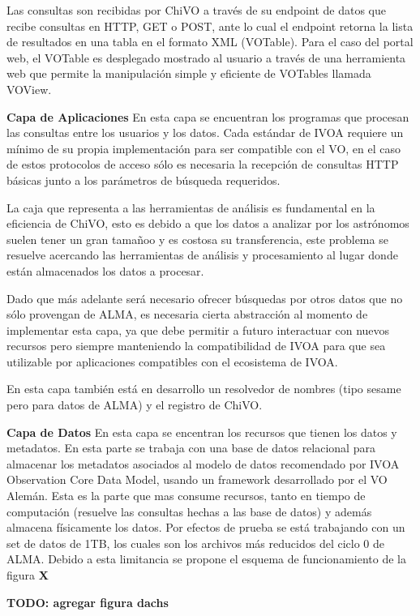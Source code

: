 Las consultas son recibidas por ChiVO a través de su endpoint de datos que recibe consultas en HTTP, GET o POST, ante lo cual el endpoint retorna la lista de resultados en una tabla en el formato XML (VOTable). Para el caso del portal web, el VOTable es desplegado mostrado al usuario a través de una herramienta web que permite la manipulación simple y eficiente de VOTables llamada VOView.

\textbf{Capa de Aplicaciones}
En esta capa se encuentran los programas que procesan las consultas entre los usuarios y los datos. 
Cada estándar de IVOA requiere un mínimo de su propia implementación para ser compatible con el VO, en el caso de estos protocolos de acceso sólo es necesaria la recepción de consultas HTTP básicas junto a los parámetros de búsqueda requeridos.

La caja que representa a las herramientas de análisis es fundamental en la eficiencia de ChiVO, esto es debido a que los datos a analizar por los astrónomos suelen tener un gran tamañoo y es costosa su transferencia, este problema se resuelve acercando las herramientas de análisis y procesamiento al lugar donde están almacenados los datos a procesar. 

Dado que más adelante será necesario ofrecer búsquedas por otros datos que no sólo provengan de ALMA, es necesaria cierta abstracción al momento de implementar esta capa, ya que debe permitir a futuro interactuar con nuevos recursos pero siempre manteniendo la compatibilidad de IVOA para que sea utilizable por aplicaciones compatibles con el ecosistema de IVOA.

En esta capa también está en desarrollo un resolvedor de nombres (tipo sesame pero para datos de ALMA) y el registro de ChiVO.

\textbf{Capa de Datos}
En esta capa se encentran los recursos que tienen los datos y metadatos. En esta parte se trabaja con una base de datos relacional para almacenar los metadatos asociados al modelo de datos recomendado por IVOA Observation Core Data Model, usando un framework desarrollado por el VO Alemán. Esta es la parte que mas consume recursos, tanto en tiempo de computación (resuelve las consultas hechas a las base de datos) y además almacena físicamente los datos. Por efectos de prueba se está trabajando con un set de datos de 1TB, los cuales son los archivos más reducidos del ciclo 0 de ALMA. Debido a esta limitancia se propone el esquema de funcionamiento de la figura \textbf{X}

\textbf{TODO: agregar figura dachs}

